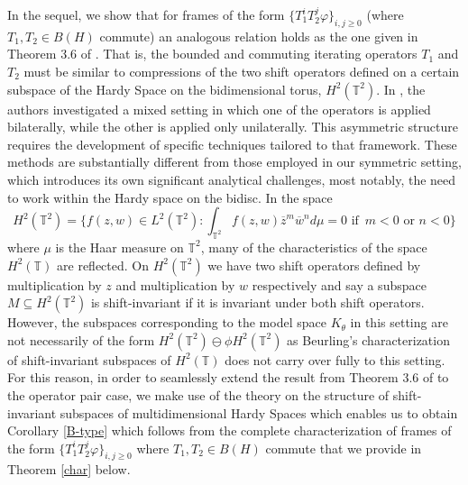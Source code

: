 \documentclass[12pt,reqno]{amsart}
\theoremstyle{definition}
\theoremstyle{definition}
\numberwithin{equation}{section}
\begin{document}
 In the sequel, we show that for frames of the form $\{T_{1}^iT_{2}^j\varphi\}_{i,j \geq 0}$ (where $T_{1}, T_{2} \in B(H)$ commute) an analogous relation holds as the one given in Theorem 3.6 of \cite{CHP20}. That is, the bounded and commuting iterating operators $T_{1}$ and $T_{2}$ must be similar to compressions of the two shift operators defined on a certain subspace of the Hardy Space on the bidimensional torus, $H^2(\mathbb{T}^2)$. 
In \cite{ACCP22}, the authors investigated a mixed setting in which one of the operators is applied bilaterally, while the other is applied only unilaterally. This asymmetric structure requires the development of specific techniques tailored to that framework. These methods are substantially different from those employed in our symmetric setting, which introduces its own significant analytical challenges, most notably, the need to work within the Hardy space on the bidisc.
In the space 
\begin{displaymath}
H^2(\mathbb{T}^2) = \{f(z, w) \in L^2(\mathbb{T}^2): \int_{\mathbb{T}^2} f(z,w) \overline{z}^m \overline{w}^n d \mu = 0 \, \, \text{if} \, \, \,  m<0 \, \, \text{or} \, \, n<0 \} 
\end{displaymath}
where $\mu$ is the Haar measure on $\mathbb{T}^2$, many of the characteristics of the space $H^2(\mathbb{T})$ are reflected. On $H^2(\mathbb{T}^2)$ we have two shift operators defined by multiplication by $z$ and multiplication by $w$ respectively and say a subspace $M \subseteq H^2(\mathbb{T}^2)$  is shift-invariant if it is invariant under both shift operators. However, the subspaces corresponding to the model space $K_\theta$ in this setting are not necessarily of the form $H^2(\mathbb{T}^2) \ominus \phi H^2(\mathbb{T}^2)$ as Beurling's characterization of shift-invariant subspaces of $H^2(\mathbb{T})$ does not carry over fully to this setting. For this reason, in order to seamlessly extend the result from Theorem 3.6 of \cite{CHP20} to the operator pair case, we make use of the theory on the structure of shift-invariant subspaces of multidimensional Hardy Spaces which enables us to obtain Corollary \ref{B-type} which follows from the  complete characterization of frames of the form $\{T_{1}^iT_{2}^j\varphi\}_{i,j \geq 0}$ where $T_{1}, T_{2} \in B(H)$ commute that we provide in Theorem \ref{char} below.
\end{document}
